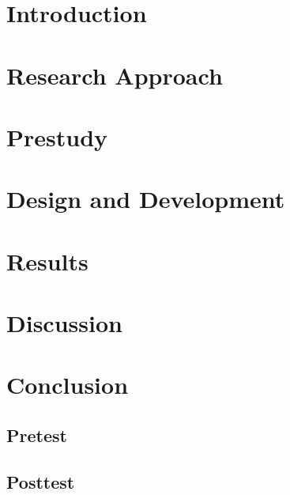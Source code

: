 \documentclass[12pt,a4paper]{book}
\newcommand{\blankpage}[0]{
	\newpage
	\thispagestyle{plain}
	\mbox{}
}
\begin{document}
\hypersetup{pageanchor=false}

\blankpage	
\cleardoublepage
\frontmatter



\tableofcontents
\listoftables
\listoffigures
\hypersetup{pageanchor=true}

\mainmatter
\part{Introduction}\label{part:introduction}


\part{Research Approach}\label{part:approach}


\part{Prestudy}\label{part:literature}


\part{Design and Development}\label{part:development}


\part{Results}\label{part:results}


\part{Discussion}\label{part:discussion}


\part{Conclusion}\label{part:conslusion}


\clearpage


\begin{appendices}
	\chapter{Pretest}\label{appendix:pretest}
		
	\chapter{Posttest}\label{appendix:posttest}
			
\end{appendices}
\end{document}
